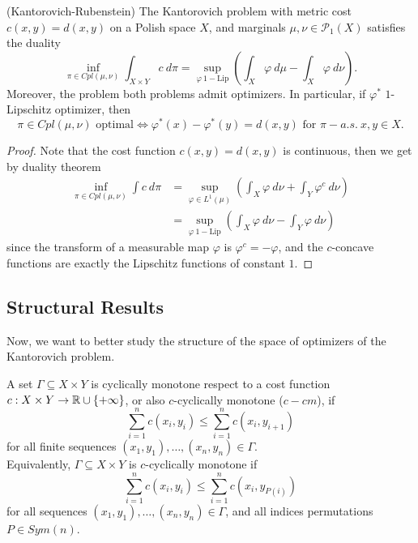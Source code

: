 \documentclass[../main.tex]{subfiles}
\begin{document}
\begin{corollary}
    \label{thm:Kantorovich-Rubenstein_classicOT}
    (Kantorovich-Rubenstein) 
    The Kantorovich problem with metric cost $c(x, y) = d(x, y)$ on a Polish space $X$, and marginals $\mu, \nu\in\mathcal{P}_1(X)$ satisfies the duality
    $$
    \inf_{\pi\in Cpl(\mu, \nu)} \int_{X\times Y} c \ d\pi = \sup_{\varphi  \ 1-\text{Lip}} \left(\int_X \varphi \ d \mu - \int_X \varphi \ d \nu\right).
    $$
    Moreover, the problem both problems admit optimizers. In particular, if $\varphi^*$ $1$-Lipschitz optimizer, then 
    $$
    \pi\in Cpl(\mu, \nu) \text{ optimal} \iff \varphi^*(x)-\varphi^*(y)=d(x, y) \text{ for } \pi-a.s. \ x, y\in X.
    $$
\end{corollary}
\begin{proof}
    Note that the cost function $c(x, y) = d(x, y)$ is continuous, then we get by duality theorem 
    \begin{align*}
        \inf_{\pi\in Cpl(\mu, \nu)} \int c \ d\pi 
        &= \sup_{\varphi\in L^1(\mu)} \left(\int_X \varphi \ d\nu + \int_Y \varphi^c \ d\nu\right) \\
        &= \sup_{\varphi  \ 1-\text{Lip}} \left(\int_X \varphi \ d\nu - \int_Y \varphi \ d\nu\right)
    \end{align*}    
    since the transform of a measurable map $\varphi$ is $\varphi^c=-\varphi$, and the $c$-concave functions are exactly the Lipschitz functions of constant $1$.
\end{proof}

\subsection{Structural Results}
Now, we want to better study the structure of the space of optimizers of the Kantorovich problem.

\begin{definition}
    A set $\Gamma\subseteq X\times Y$ is cyclically monotone respect to a cost function $c: X\times Y\to \mathbb{R}\cup\{+\infty\}$, or also $c$-cyclically monotone ($c-cm$), if 
    $$
    \sum_{i=1}^n c(x_i, y_i) \leq \sum_{i=1}^n c(x_i, y_{i+1})
    $$
    for all finite sequences $(x_1, y_1), \dots, (x_n, y_n)\in\Gamma$. \\
    Equivalently, $\Gamma\subseteq X \times Y$ is $c$-cyclically monotone if 
    $$
    \sum_{i=1}^n c(x_i, y_i) \leq \sum_{i=1}^n c(x_i, y_{P(i)})
    $$
    for all sequences $(x_1, y_1), \dots, (x_n, y_n)\in\Gamma$, and all indices permutations $P\in Sym(n)$.
\end{definition}
\end{document}
